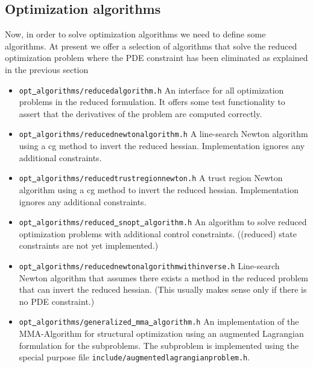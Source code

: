 \subsection{Optimization algorithms}
Now, in order to solve optimization algorithms we need to define some algorithms.
At present we offer a selection of algorithms that solve the reduced optimization 
problem where the PDE constraint has been eliminated as explained in the previous section
\begin{itemize}
\item {\tt opt\underline{ }algorithms/reducedalgorithm.h} An interface for all 
  optimization problems in the reduced formulation. It offers some test functionality
  to assert that the derivatives of the problem are computed correctly.
\item {\tt opt\underline{ }algorithms/reducednewtonalgorithm.h}
  A line-search Newton algorithm using a cg method to invert the reduced hessian. 
  Implementation ignores any additional constraints.
\item {\tt opt\underline{ }algorithms/reducedtrustregionnewton.h}
  A trust region Newton algorithm using a cg method to invert the reduced hessian.
  Implementation ignores any additional constraints.
\item {\tt opt\underline{ }algorithms/reduced\underline{ }snopt\underline{ }algorithm.h}
  An algorithm to solve reduced optimization problems with additional control constraints.
  ((reduced) state constraints are not yet implemented.)
\item {\tt opt\underline{ }algorithms/reducednewtonalgorithmwithinverse.h}
  Line-search Newton algorithm that assumes there exists a method in the reduced problem
  that can invert the reduced hessian. (This usually makes sense only if there is no 
  PDE constraint.)
\item {\tt opt\underline{ }algorithms/generalized\underline{ }mma\underline{ }algorithm.h}
  An implementation of the MMA-Algorithm for structural optimization using an augmented
  Lagrangian formulation for the subproblems. The subproblem is implemented using the 
  special purpose file
  {\tt include/augmentedlagrangianproblem.h}.
\end{itemize} 

